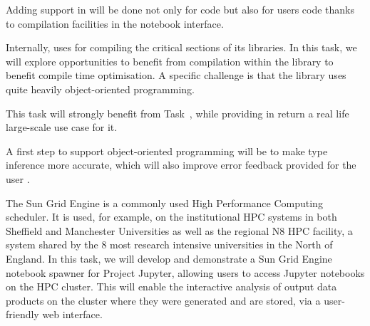 \begin{workpackage}
\begin{tasklist}
\begin{task}[title=Pythran,id=pythran,lead=UJF]
  Adding \Pythran support in \Sage will be done not only for \Sage code but also
  for \Sage users code thanks to compilation facilities in the notebook interface.


  Internally, \Sage uses \Cython for compiling the critical sections of
  its libraries. In this task, we will explore opportunities to
  benefit from \Pythran compilation within the \Sage library to benefit
  \Pythran compile time optimisation. A specific challenge is that the \Sage
  library uses quite heavily object-oriented programming.

  This task will strongly benefit from Task~,
  while providing in return a real life large-scale use case for it.

  A first step to support object-oriented programming will be to make
  \Pythran type inference more accurate, which will also improve error
  feedback provided for the user .
\end{task}

\begin{task}[title=Sun Grid Engine Integration in Project Jupyter Hub, lead=USH,id=hpc-jupyter]
The Sun Grid Engine is a commonly used High Performance Computing scheduler. It is used, for example, on the institutional HPC systems in both Sheffield and Manchester Universities as well as the regional N8 HPC facility, a system shared by the 8 most research intensive universities in the North of England. In this task, we will develop and demonstrate a Sun Grid Engine notebook spawner for Project Jupyter, allowing users to access Jupyter notebooks on the HPC cluster. This will enable the interactive analysis of output data products on the cluster where they were generated and are stored, via a user-friendly web interface.
\end{task}


\end{tasklist}
\end{workpackage}
